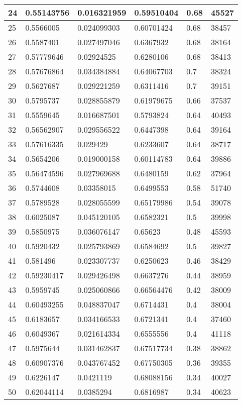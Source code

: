 \begin{longtable}{|l|l|l|l|l|l|}
24 & 0.55143756 & 0.016321959 & 0.59510404 & 0.68 & 45527 \\ \hline 
25 & 0.5566005 & 0.024099303 & 0.60701424 & 0.68 & 38457 \\ \hline 
26 & 0.5587401 & 0.027497046 & 0.6367932 & 0.68 & 38164 \\ \hline 
27 & 0.57779646 & 0.02924525 & 0.6280106 & 0.68 & 38413 \\ \hline 
28 & 0.57676864 & 0.034384884 & 0.64067703 & 0.7 & 38324 \\ \hline 
29 & 0.5627687 & 0.029221259 & 0.6311416 & 0.7 & 39151 \\ \hline 
30 & 0.5795737 & 0.028855879 & 0.61979675 & 0.66 & 37537 \\ \hline 
31 & 0.5559645 & 0.016687501 & 0.5793824 & 0.64 & 40493 \\ \hline 
32 & 0.56562907 & 0.029556522 & 0.6447398 & 0.64 & 39164 \\ \hline 
33 & 0.57616335 & 0.029429 & 0.6233607 & 0.64 & 38717 \\ \hline 
34 & 0.5654206 & 0.019000158 & 0.60114783 & 0.64 & 39886 \\ \hline 
35 & 0.56474596 & 0.027969688 & 0.6480159 & 0.62 & 37964 \\ \hline 
36 & 0.5744608 & 0.03358015 & 0.6499553 & 0.58 & 51740 \\ \hline 
37 & 0.5789528 & 0.028055599 & 0.65179986 & 0.54 & 39078 \\ \hline 
38 & 0.6025087 & 0.045120105 & 0.6582321 & 0.5 & 39998 \\ \hline 
39 & 0.5850975 & 0.036076147 & 0.65623 & 0.48 & 45593 \\ \hline 
40 & 0.5920432 & 0.025793869 & 0.6584692 & 0.5 & 39827 \\ \hline 
41 & 0.581496 & 0.023307737 & 0.6250623 & 0.46 & 38429 \\ \hline 
42 & 0.59230417 & 0.029426498 & 0.6637276 & 0.44 & 38959 \\ \hline 
43 & 0.5959745 & 0.025060866 & 0.66564476 & 0.42 & 38009 \\ \hline 
44 & 0.60493255 & 0.048837047 & 0.6714431 & 0.4 & 38004 \\ \hline 
45 & 0.6183657 & 0.034166533 & 0.6721341 & 0.4 & 37460 \\ \hline 
46 & 0.6049367 & 0.021614334 & 0.6555556 & 0.4 & 41118 \\ \hline 
47 & 0.5975644 & 0.031462837 & 0.67517734 & 0.38 & 38862 \\ \hline 
48 & 0.60907376 & 0.043767452 & 0.67750305 & 0.36 & 39355 \\ \hline 
49 & 0.6226147 & 0.0421119 & 0.68088156 & 0.34 & 40027 \\ \hline 
50 & 0.62044114 & 0.0385294 & 0.6816987 & 0.34 & 40623 \\ \hline 
\end{longtable}